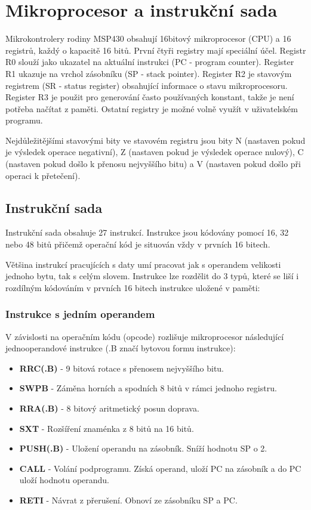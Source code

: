 \section{Mikroprocesor a instrukční sada}

Mikrokontrolery rodiny MSP430 obsahují 16bitový mikroprocesor (CPU) a 16 registrů, každý o kapacitě 16 bitů. První čtyři registry mají speciální účel. Registr R0 slouží jako ukazatel na aktuální instrukci (PC - program counter). Register R1 ukazuje na vrchol zásobníku (SP - stack pointer). Register R2 je stavovým registrem (SR - status register) obsahující informace o stavu mikroprocesoru. Register R3 je použit pro generování často používaných konstant, takže je není potřeba načítat z paměti. Ostatní registry je možné volně využít v uživatelském programu.

Nejdůležitějšími stavovými bity ve stavovém registru jsou bity N (nastaven pokud je výsledek operace negativní), Z (nastaven pokud je výsledek operace nulový), C (nastaven pokud došlo k přenosu nejvyššího bitu) a V (nastaven pokud došlo při operaci k přetečení).

\subsection{Instrukční sada}

Instrukční sada obsahuje 27 instrukcí. Instrukce jsou kódovány pomocí 16, 32 nebo 48 bitů přičemž operační kód je situován vždy v prvních 16 bitech.

Většina instrukcí pracujících s daty umí pracovat jak s operandem velikosti jednoho bytu, tak s celým slovem. Instrukce lze rozdělit do 3 typů, které se liší i rozdílným kódováním v prvních 16 bitech instrukce uložené v paměti:

\subsubsection{Instrukce s jedním operandem}

V závislosti na operačním kódu (opcode) rozlišuje mikroprocesor následující jednooperandové instrukce (.B značí bytovou formu instrukce):

\begin{itemize}
\item \textbf{RRC(.B)} - 9 bitová rotace s přenosem nejvyššího bitu.
\item \textbf{SWPB} - Záměna horních a spodních 8 bitů v rámci jednoho registru.
\item \textbf{RRA(.B)} - 8 bitový aritmetický posun doprava.
\item \textbf{SXT} - Rozšíření znaménka z 8 bitů na 16 bitů.
\item \textbf{PUSH(.B)} - Uložení operandu na zásobník. Sníží hodnotu SP o 2.
\item \textbf{CALL} - Volání podprogramu. Získá operand, uloží PC na zásobník a do PC uloží hodnotu operandu.
\item \textbf{RETI} - Návrat z přerušení. Obnoví ze zásobníku SP a PC.
\end{itemize}

